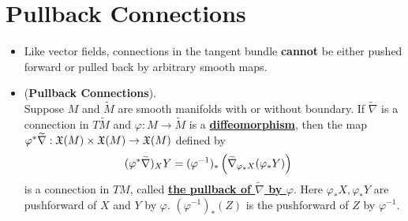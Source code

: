 \documentclass[11pt]{article}
\begin{document}
\section{Pullback Connections}
\begin{itemize}
\item \begin{remark}
Like vector fields, connections in the tangent bundle \textbf{cannot} be either pushed forward or pulled back by arbitrary smooth maps.
\end{remark}

\item 
\begin{lemma} (\textbf{Pullback Connections}). \citep{lee2018introduction} \\
Suppose $M$ and $\widetilde{M}$ are smooth manifolds with or without boundary. If $\widetilde{\nabla}$ is a connection in $T\widetilde{M}$ and  $\varphi: M \rightarrow \widetilde{M}$ is a \underline{\textbf{diffeomorphism}}, then the map $\varphi^{*}\widetilde{\nabla}:  {\mathfrak X}(M) \times {\mathfrak X}(M) \rightarrow {\mathfrak X}(M)$ defined by
\begin{align}
(\varphi^{*}\widetilde{\nabla})_{X}Y&= (\varphi^{-1})_{*}\left(\widetilde{\nabla}_{\varphi_{*}X}{(\varphi_{*}Y)}\right) \label{eqn: pullback_connections}
\end{align} is a connection in $TM$, called \underline{\textbf{the pullback of $\widetilde{\nabla}$ by $\varphi$}}. Here $\varphi_{*}X, \varphi_{*}Y$ are pushforward of $X$ and $Y$ by $\varphi$. $(\varphi^{-1})_{*}(Z)$ is the pushforward of $Z$ by $\varphi^{-1}$.
\end{lemma}


\end{itemize}
\end{document}
